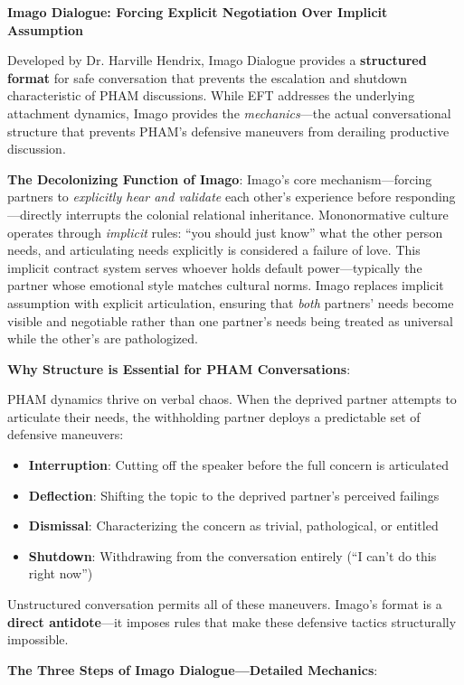 \documentclass[12pt, letterpaper]{article}
\begin{document}
\textbf{Imago Dialogue: Forcing Explicit Negotiation Over Implicit Assumption}

Developed by Dr. Harville Hendrix, Imago Dialogue provides a \textbf{structured format} for safe conversation that prevents the escalation and shutdown characteristic of PHAM discussions. While EFT addresses the underlying attachment dynamics, Imago provides the \textit{mechanics}---the actual conversational structure that prevents PHAM's defensive maneuvers from derailing productive discussion.

\textbf{The Decolonizing Function of Imago}: Imago's core mechanism---forcing partners to \textit{explicitly hear and validate} each other's experience before responding---directly interrupts the colonial relational inheritance. Mononormative culture operates through \textit{implicit} rules: ``you should just know'' what the other person needs, and articulating needs explicitly is considered a failure of love. This implicit contract system serves whoever holds default power---typically the partner whose emotional style matches cultural norms. Imago replaces implicit assumption with explicit articulation, ensuring that \textit{both} partners' needs become visible and negotiable rather than one partner's needs being treated as universal while the other's are pathologized.

\textbf{Why Structure is Essential for PHAM Conversations}:

PHAM dynamics thrive on verbal chaos. When the deprived partner attempts to articulate their needs, the withholding partner deploys a predictable set of defensive maneuvers:
\begin{itemize}
    \item \textbf{Interruption}: Cutting off the speaker before the full concern is articulated
    \item \textbf{Deflection}: Shifting the topic to the deprived partner's perceived failings
    \item \textbf{Dismissal}: Characterizing the concern as trivial, pathological, or entitled
    \item \textbf{Shutdown}: Withdrawing from the conversation entirely (``I can't do this right now'')
\end{itemize}

Unstructured conversation permits all of these maneuvers. Imago's format is a \textbf{direct antidote}---it imposes rules that make these defensive tactics structurally impossible.

\textbf{The Three Steps of Imago Dialogue---Detailed Mechanics}:
\end{document}
